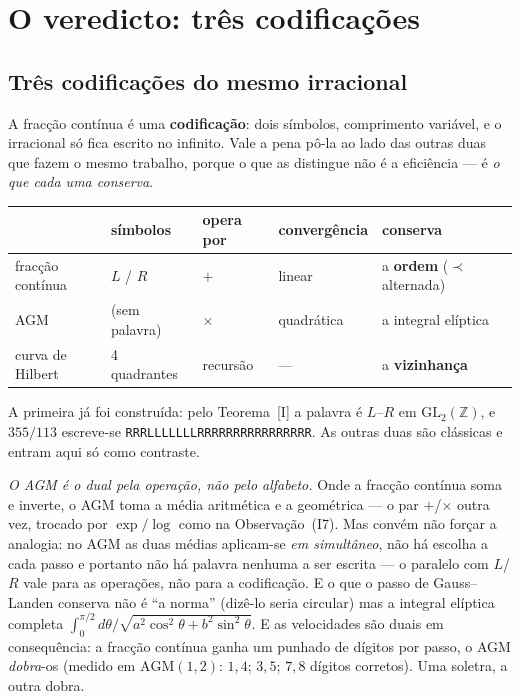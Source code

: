 \documentclass[11pt,a4paper]{article}
\theoremstyle{plain}
\theoremstyle{definition}
\theoremstyle{remark}
\newcommand{\Z}{\mathbb{Z}}
\newcommand{\GL}{\mathrm{GL}}
\begin{document}
\section{O veredicto: três codificações}\label{sec:vered}

\subsection{Três codificações do mesmo irracional}\label{sec:codificacoes}

A fracção contínua é uma \textbf{codificação}: dois símbolos, comprimento variável, e o irracional
só fica escrito no infinito. Vale a pena pô-la ao lado das outras duas que fazem o mesmo trabalho,
porque o que as distingue não é a eficiência --- é \emph{o que cada uma conserva}.

\begin{center}\small
\begin{tabular}{lllll}
\hline
 & símbolos & opera por & convergência & conserva \\ \hline
fracção contínua & $L$ / $R$ & $+$ & linear & a \textbf{ordem} ($\prec$ alternada) \\
AGM & (sem palavra) & $\times$ & quadrática & a integral elíptica \\
curva de Hilbert & 4 quadrantes & recursão & --- & a \textbf{vizinhança} \\
\hline
\end{tabular}
\end{center}

\noindent A primeira já foi construída: pelo Teorema~[I] a palavra é $L$--$R$ em
$\GL_2(\Z)$, e $355/113$ escreve-se \texttt{RRRLLLLLLLRRRRRRRRRRRRRRRR}. As outras duas são
clássicas e entram aqui só como contraste.

\emph{O AGM é o dual pela operação, não pelo alfabeto.} Onde a fracção contínua soma e inverte, o
AGM toma a média aritmética e a geométrica --- o par $+$/$\times$ outra vez, trocado por
$\exp/\log$ como na Observação~(I7). Mas convém não forçar a analogia: no AGM as duas
médias aplicam-se \emph{em simultâneo}, não há escolha a cada passo e portanto não há palavra
nenhuma a ser escrita --- o paralelo com $L$/$R$ vale para as operações, não para a codificação. E
o que o passo de Gauss--Landen conserva não é ``a norma'' (dizê-lo seria circular) mas a integral
elíptica completa $\int_0^{\pi/2} d\theta/\sqrt{a^2\cos^2\theta+b^2\sin^2\theta}$. E as velocidades são duais em consequência: a fracção contínua ganha um
punhado de dígitos por passo, o AGM \emph{dobra}-os (medido em $\mathrm{AGM}(1,2)$: $1{,}4$;
$3{,}5$; $7{,}8$ dígitos corretos). Uma soletra, a outra dobra.
\end{document}
